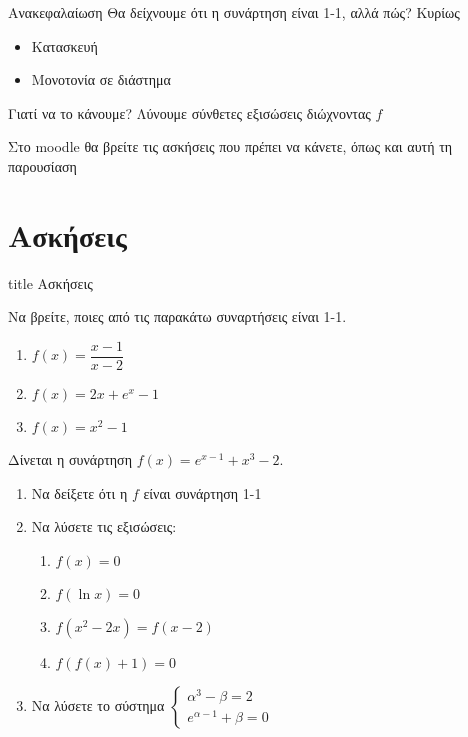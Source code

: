 \documentclass{presentation}
\begin{document}
\begin{frame}{Ανακεφαλαίωση}
  Θα δείχνουμε ότι η συνάρτηση είναι 1-1, αλλά πώς? \pause
  Κυρίως
  \begin{itemize}
    \item Κατασκευή \pause
    \item Μονοτονία σε διάστημα
  \end{itemize} \pause
  \begin{alertblock}{Γιατί να το κάνουμε?}
    Λύνουμε σύνθετες εξισώσεις διώχνοντας $f$
  \end{alertblock}
\end{frame}

\begin{frame}[noframenumbering]
  Στο moodle θα βρείτε τις ασκήσεις που πρέπει να κάνετε, όπως και αυτή τη παρουσίαση
\end{frame}

\section{Ασκήσεις}

\begin{frame}[noframenumbering]
  \vfill
  \centering
  \begin{beamercolorbox}[sep=8pt,center,shadow=true,rounded=true]{title}
    Ασκήσεις
  \end{beamercolorbox}
  \vfill
\end{frame}

\begin{askisi}
  Να βρείτε, ποιες από τις  παρακάτω συναρτήσεις είναι 1-1.
  \begin{enumerate}
    \item $f(x)=\dfrac{x-1}{x-2}$\pause
    \item $f(x)=2x+e^x-1$\pause
    \item $f(x)=x^2-1$
  \end{enumerate}
\end{askisi}

\begin{askisi}
  Δίνεται η συνάρτηση $f(x)=e^{x-1}+x^3-2$.
  \begin{enumerate}[<+-|alert@+>]
    \item Να δείξετε ότι η $f$ είναι συνάρτηση 1-1
    \item Να λύσετε τις εξισώσεις:
          \begin{enumerate}[<+-|alert@+>]
            \item $f(x)=0$
            \item $f(\ln x)=0$
            \item $f(x^2-2x)=f(x-2)$
            \item $f\left(f(x)+1\right)=0$
          \end{enumerate}
    \item Να λύσετε το σύστημα $\begin{cases}
              α^3-β=2 \\
              e^{α-1}+β=0
            \end{cases}$
  \end{enumerate}
\end{askisi}
\end{document}

